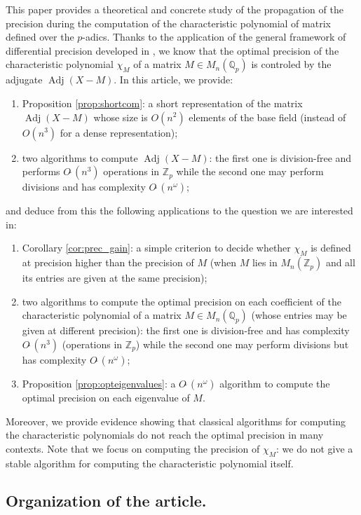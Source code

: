 \documentclass[sigconf]{acmart}
\DeclareMathOperator{\adj}{Adj}
\newcommand{\Z}{\mathbb Z}
\newcommand{\Zp}{\Z_p}
\newcommand{\Q}{\mathbb Q}
\newcommand{\Qp}{\Q_p}
\newcommand{\softO}{O\tilde{~}}
\theoremstyle{definition}
\begin{document}
This paper provides a theoretical and concrete study of the propagation 
of the precision during the computation of the characteristic polynomial 
of matrix defined over the $p$-adics. Thanks to the application of the 
general framework of differential precision developed in 
\cite{caruso-roe-vaccon:14a,caruso-roe-vaccon:15a}, we know that the 
optimal precision of the characteristic polynomial $\chi_M$ of a matrix 
$M \in M_n(\mathbb{Q}_p)$ is controled by the adjugate $\adj(X{-}M).$
In this article, we provide:
\begin{enumerate}
\renewcommand{\itemsep}{0pt}
\item Proposition \ref{prop:shortcom}: a short representation of
the matrix $\adj(X{-}M)$ whose size is $O(n^2)$ elements of the base
field (instead of $O(n^3)$ for a dense representation);
\item two algorithms to compute $\adj(X{-}M)$: the first one is 
division-free and performs $\softO(n^3)$ operations in $\Zp$ while 
the second one may perform divisions and has complexity $\softO(n^\omega)$;
\end{enumerate}
and deduce from this the following applications to the question
we are interested in:
\begin{enumerate}
\renewcommand{\itemsep}{0pt}
\setcounter{enumi}{2}
\item Corollary \ref{cor:prec_gain}: a simple criterion to decide 
whether $\chi_M$ is defined at precision higher than the precision of 
$M$ (when $M$ lies in $M_n(\mathbb{Z}_p)$ and all its entries are given 
at the same precision);
\item two algorithms to compute the optimal precision on each 
coefficient of the characteristic polynomial of a matrix $M \in 
M_n(\Qp)$ (whose entries may be given at different precision): the first 
one is division-free and has complexity $\softO(n^3)$ (operations in
$\Zp$) while the second 
one may perform divisions but has complexity $\softO(n^\omega)$;
\item Proposition \ref{prop:opteigenvalues}: a $\softO(n^\omega)$
algorithm to compute the optimal precision on each eigenvalue of $M$.
\end{enumerate}
Moreover, we provide evidence showing that classical algorithms for 
computing the characteristic polynomials do not reach the optimal 
precision in many contexts.
Note that we focus on computing the precision of $\chi_M$: we do not give a stable
algorithm for computing the characteristic polynomial itself.

\subsection*{Organization of the article.}
\end{document}
